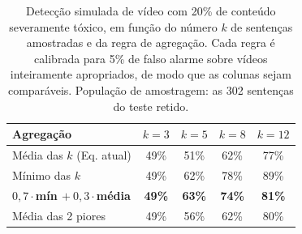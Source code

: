 \begin{table}[!t]
\centering
\caption{Detecção simulada de vídeo com 20\% de conteúdo severamente tóxico, em função do número $k$ de sentenças amostradas e da regra de agregação. Cada regra é calibrada para 5\% de falso alarme sobre vídeos inteiramente apropriados, de modo que as colunas sejam comparáveis. População de amostragem: as 302 sentenças do teste retido.}
\label{tab:simulacao}
\begin{tabular}{lcccc}
\hline
Agregação & $k=3$ & $k=5$ & $k=8$ & $k=12$ \\
\hline
Média das $k$ (Eq. atual) & 49\% & 51\% & 62\% & 77\% \\
Mínimo das $k$ & 49\% & 62\% & 78\% & 89\% \\
\textbf{$0{,}7\cdot$mín $+\ 0{,}3\cdot$média} & \textbf{49\%} & \textbf{63\%} & \textbf{74\%} & \textbf{81\%} \\
Média das 2 piores & 49\% & 56\% & 62\% & 80\% \\
\hline
\end{tabular}
\end{table}
